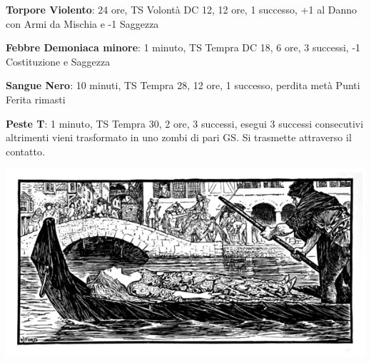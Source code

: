 \begin{multicols}{2}
\textbf{Torpore Violento}: 24 ore, TS Volontà DC 12, 12 ore, 1 successo, +1 al Danno con Armi da Mischia e -1 Saggezza

\textbf{Febbre Demoniaca minore}: 1 minuto, TS Tempra DC 18, 6 ore, 3 successi, -1 Costituzione e Saggezza

\textbf{Sangue Nero}: 10 minuti, TS Tempra 28, 12 ore, 1 successo, perdita metà Punti Ferita rimasti

\textbf{Peste T}: 1 minuto, TS Tempra 30, 2 ore, 3 successi, esegui 3 successi consecutivi altrimenti vieni trasformato in uno zombi di pari GS. Si trasmette attraverso il contatto.

\end{multicols}

\vfill

\begin{center}
\includegraphics[width=0.8\linewidth]{immagini/funeralebarca.png}
\end{center}



\pagebreak

